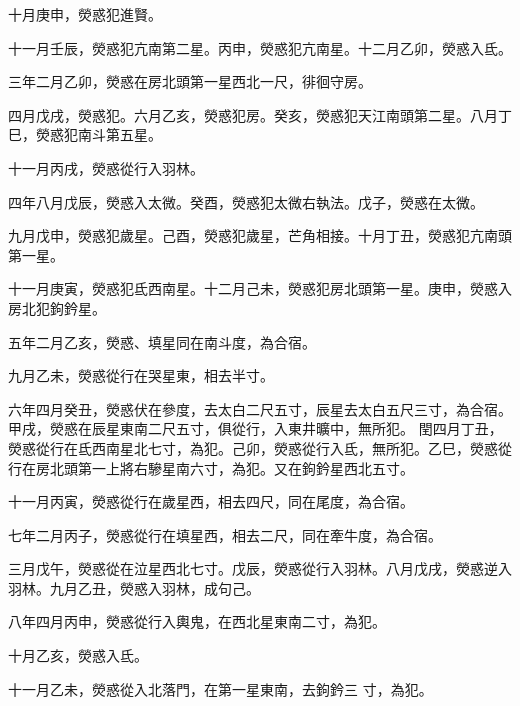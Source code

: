 \begin{pinyinscope}
 十月庚申，熒惑犯進賢。



 十一月壬辰，熒惑犯亢南第二星。丙申，熒惑犯亢南星。十二月乙卯，熒惑入氐。



 三年二月乙卯，熒惑在房北頭第一星西北一尺，徘徊守房。



 四月戊戌，熒惑犯。六月乙亥，熒惑犯房。癸亥，熒惑犯天江南頭第二星。八月丁巳，熒惑犯南斗第五星。



 十一月丙戌，熒惑從行入羽林。



 四年八月戊辰，熒惑入太微。癸酉，熒惑犯太微右執法。戊子，熒惑在太微。



 九月戊申，熒惑犯歲星。己酉，熒惑犯歲星，芒角相接。十月丁丑，熒惑犯亢南頭第一星。



 十一月庚寅，熒惑犯氐西南星。十二月己未，熒惑犯房北頭第一星。庚申，熒惑入房北犯鉤鈐星。



 五年二月乙亥，熒惑、填星同在南斗度，為合宿。



 九月乙未，熒惑從行在哭星東，相去半寸。



 六年四月癸丑，熒惑伏在參度，去太白二尺五寸，辰星去太白五尺三寸，為合宿。甲戌，熒惑在辰星東南二尺五寸，俱從行，入東井曠中，無所犯。
 閏四月丁丑，熒惑從行在氐西南星北七寸，為犯。己卯，熒惑從行入氐，無所犯。乙巳，熒惑從行在房北頭第一上將右驂星南六寸，為犯。又在鉤鈐星西北五寸。



 十一月丙寅，熒惑從行在歲星西，相去四尺，同在尾度，為合宿。



 七年二月丙子，熒惑從行在填星西，相去二尺，同在牽牛度，為合宿。



 三月戊午，熒惑從在泣星西北七寸。戊辰，熒惑從行入羽林。八月戊戌，熒惑逆入羽林。九月乙丑，熒惑入羽林，成句己。



 八年四月丙申，熒惑從行入輿鬼，在西北星東南二寸，為犯。



 十月乙亥，熒惑入氐。



 十一月乙未，熒惑從入北落門，在第一星東南，去鉤鈐三
 寸，為犯。




\end{pinyinscope}
